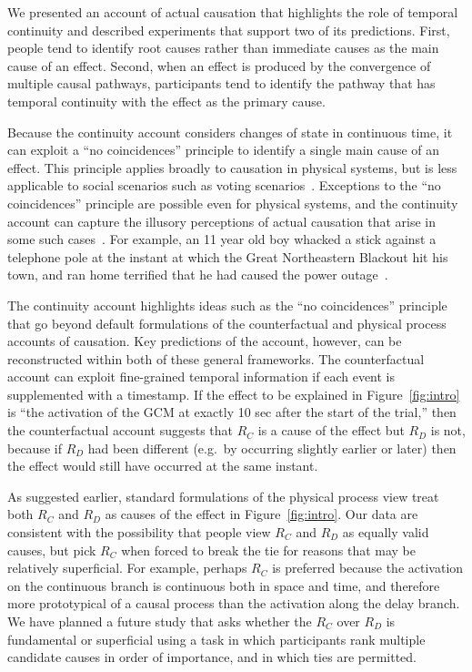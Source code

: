 \documentclass[10pt,letterpaper]{article}
\newcommand{\ev}[2]{$#1_#2$}
\begin{document}
We presented an account of actual causation that highlights the role of temporal continuity and described experiments that support two of its predictions. First, people tend to identify root causes rather than immediate causes as the main cause of an effect. Second, when an effect is produced by the convergence of multiple causal pathways, participants tend to identify the pathway that has temporal continuity with the effect as the primary cause.

Because the continuity account considers changes of state in continuous time, it can exploit a ``no coincidences'' principle to identify a single main cause of an effect. This principle applies broadly to causation in physical systems, but is less applicable to social scenarios such as voting scenarios~\cite{livengood13}. Exceptions to the ``no coincidences'' principle are possible even for physical systems, and the continuity account can capture the illusory perceptions of actual causation that arise in some such cases~\cite{thorstadw16}. For example, an 11 year old boy whacked a stick against a telephone pole at the instant at which the Great Northeastern Blackout hit his town, and ran home terrified that he had caused the power outage~\cite{gelbr1965night}. 

The continuity account highlights ideas such as the ``no coincidences'' principle that go beyond default formulations of the counterfactual and physical process accounts of causation. Key predictions of the account, however, can be reconstructed within both of these general frameworks. The counterfactual account can exploit fine-grained temporal information if each event is supplemented with a timestamp. If the effect to be explained in Figure~\ref{fig:intro} is ``the activation of the GCM at exactly 10 sec after the start of the trial,'' then the counterfactual account suggests that \ev{R}{C} is a cause of the effect but \ev{R}{D} is not, because if \ev{R}{D} had been different (e.g.\ by occurring slightly earlier or later) then the effect would still have occurred at the same instant.

As suggested earlier, standard formulations of the physical process view treat both \ev{R}{C} and \ev{R}{D} as causes of the effect in Figure~\ref{fig:intro}. Our data are consistent with the possibility that people view \ev{R}{C} and \ev{R}{D} as equally valid causes, but pick \ev{R}{C} when forced to break the tie for reasons that may be relatively superficial. For example, perhaps \ev{R}{C} is preferred because the activation on the continuous branch is continuous both in space and time, and therefore more prototypical of a causal process than the activation along the delay branch. We have planned a future study that asks whether the \ev{R}{C} over \ev{R}{D} is fundamental or superficial using a task in which participants rank multiple candidate causes in order of importance, and in which ties are permitted. 
\end{document}
